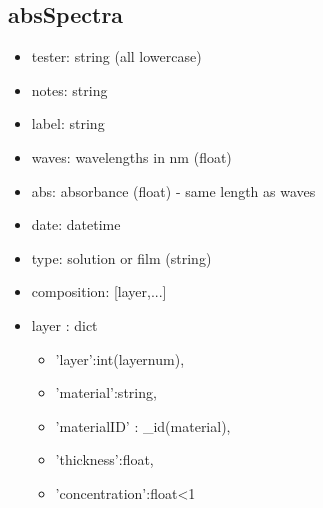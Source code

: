 \documentclass[../thesis.tex]{subfiles}
\begin{document}
\subsection{absSpectra}
\begin{itemize}
\item tester: string (all lowercase)
\item notes: string
\item label: string
\item waves: wavelengths in nm (float)
\item abs: absorbance (float) - same length as waves
\item date: datetime
\item type: solution or film (string)
\item composition: [layer,...]
\item layer : dict
\begin{itemize}
\item 'layer':int(layernum),
\item 'material':string,
\item 'materialID' : \_id(material),
\item 'thickness':float,
\item 'concentration':float<1 

\end{itemize}
\end{itemize}
\end{document}
